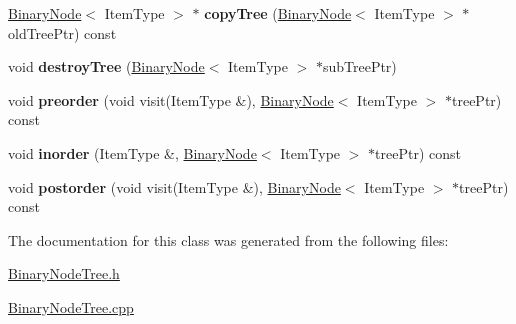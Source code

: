\begin{DoxyCompactItemize}
\hyperlink{class_binary_node}{Binary\+Node}$<$ Item\+Type $>$ $\ast$ {\bfseries copy\+Tree} (\hyperlink{class_binary_node}{Binary\+Node}$<$ Item\+Type $>$ $\ast$old\+Tree\+Ptr) const
\item 
\hypertarget{class_binary_node_tree_a3a1ed24736793b434d227939b0abd596}{}\label{class_binary_node_tree_a3a1ed24736793b434d227939b0abd596} 
void {\bfseries destroy\+Tree} (\hyperlink{class_binary_node}{Binary\+Node}$<$ Item\+Type $>$ $\ast$sub\+Tree\+Ptr)
\item 
\hypertarget{class_binary_node_tree_af04bfe7d29eb82f8cfa5f812348495da}{}\label{class_binary_node_tree_af04bfe7d29eb82f8cfa5f812348495da} 
void {\bfseries preorder} (void visit(Item\+Type \&), \hyperlink{class_binary_node}{Binary\+Node}$<$ Item\+Type $>$ $\ast$tree\+Ptr) const
\item 
\hypertarget{class_binary_node_tree_a7a9d311c2788272fc73d32066ba420e4}{}\label{class_binary_node_tree_a7a9d311c2788272fc73d32066ba420e4} 
void {\bfseries inorder} (Item\+Type \&, \hyperlink{class_binary_node}{Binary\+Node}$<$ Item\+Type $>$ $\ast$tree\+Ptr) const
\item 
\hypertarget{class_binary_node_tree_a296732b311d2645d697b08076c1e5e28}{}\label{class_binary_node_tree_a296732b311d2645d697b08076c1e5e28} 
void {\bfseries postorder} (void visit(Item\+Type \&), \hyperlink{class_binary_node}{Binary\+Node}$<$ Item\+Type $>$ $\ast$tree\+Ptr) const
\end{DoxyCompactItemize}


The documentation for this class was generated from the following files\+:\begin{DoxyCompactItemize}
\item 
\hyperlink{_binary_node_tree_8h}{Binary\+Node\+Tree.\+h}\item 
\hyperlink{_binary_node_tree_8cpp}{Binary\+Node\+Tree.\+cpp}\end{DoxyCompactItemize}
